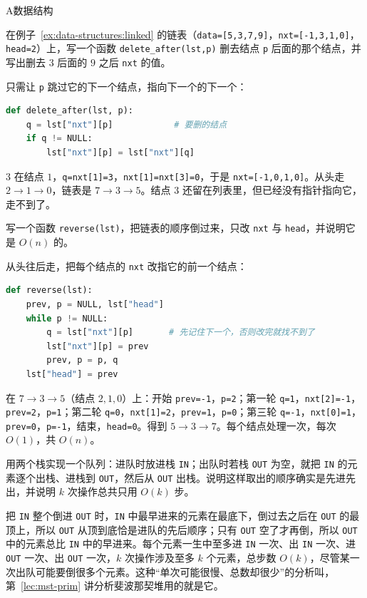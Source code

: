 \begin{exercises}{A}{数据结构}
\item\label{ex:data-structures:A1} 在例子~\ref{ex:data-structures:linked} 的链表（\texttt{data=[5,3,7,9]}，\texttt{nxt=[-1,3,1,0]}，\texttt{head=2}）上，写一个函数 \texttt{delete\_after(lst,p)} 删去结点 \texttt{p} 后面的那个结点，并写出删去 $3$ 后面的 $9$ 之后 \texttt{nxt} 的值。
\begin{solution}
只需让 \texttt{p} 跳过它的下一个结点，指向下一个的下一个：
\begin{lstlisting}[language=Python]
def delete_after(lst, p):
    q = lst["nxt"][p]            # 要删的结点
    if q != NULL:
        lst["nxt"][p] = lst["nxt"][q]
\end{lstlisting}
$3$ 在结点 $1$，\texttt{q=nxt[1]=3}，\texttt{nxt[1]=nxt[3]=0}，于是 \texttt{nxt=[-1,0,1,0]}。从头走 $2\to1\to0$，链表是 $7\to3\to5$。结点 $3$ 还留在列表里，但已经没有指针指向它，走不到了。
\end{solution}

\item\label{ex:data-structures:A2} 写一个函数 \texttt{reverse(lst)}，把链表的顺序倒过来，只改 \texttt{nxt} 与 \texttt{head}，并说明它是 $O(n)$ 的。
\begin{solution}
从头往后走，把每个结点的 \texttt{nxt} 改指它的前一个结点：
\begin{lstlisting}[language=Python]
def reverse(lst):
    prev, p = NULL, lst["head"]
    while p != NULL:
        q = lst["nxt"][p]       # 先记住下一个，否则改完就找不到了
        lst["nxt"][p] = prev
        prev, p = p, q
    lst["head"] = prev
\end{lstlisting}
在 $7\to3\to5$（结点 $2,1,0$）上：开始 \texttt{prev=-1}，\texttt{p=2}；第一轮 \texttt{q=1}，\texttt{nxt[2]=-1}，\texttt{prev=2}，\texttt{p=1}；第二轮 \texttt{q=0}，\texttt{nxt[1]=2}，\texttt{prev=1}，\texttt{p=0}；第三轮 \texttt{q=-1}，\texttt{nxt[0]=1}，\texttt{prev=0}，\texttt{p=-1}，结束，\texttt{head=0}。得到 $5\to3\to7$。每个结点处理一次，每次 $O(1)$，共 $O(n)$。
\end{solution}

\item\label{ex:data-structures:A3} 用两个栈实现一个队列：进队时放进栈 \texttt{IN}；出队时若栈 \texttt{OUT} 为空，就把 \texttt{IN} 的元素逐个出栈、进栈到 \texttt{OUT}，然后从 \texttt{OUT} 出栈。说明这样取出的顺序确实是先进先出，并说明 $k$ 次操作总共只用 $O(k)$ 步。
\begin{solution}
把 \texttt{IN} 整个倒进 \texttt{OUT} 时，\texttt{IN} 中最早进来的元素在最底下，倒过去之后在 \texttt{OUT} 的最顶上，所以 \texttt{OUT} 从顶到底恰是进队的先后顺序；只有 \texttt{OUT} 空了才再倒，所以 \texttt{OUT} 中的元素总比 \texttt{IN} 中的早进来。每个元素一生中至多进 \texttt{IN} 一次、出 \texttt{IN} 一次、进 \texttt{OUT} 一次、出 \texttt{OUT} 一次，$k$ 次操作涉及至多 $k$ 个元素，总步数 $O(k)$，尽管某一次出队可能要倒很多个元素。这种“单次可能很慢、总数却很少”的分析叫，第~\ref{lec:mst-prim} 讲分析斐波那契堆用的就是它。
\end{solution}


\end{exercises}
